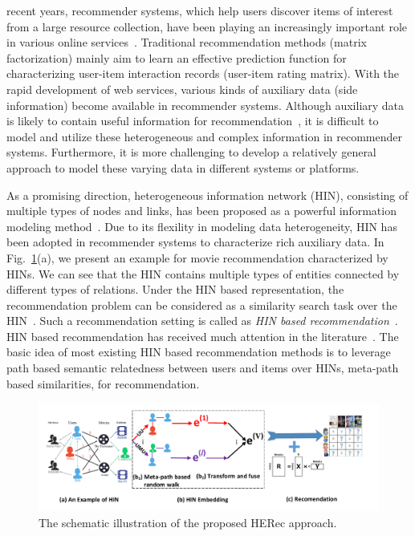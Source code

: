 
 recent years, recommender systems, which help users discover items of interest from a large resource collection, have been playing an increasingly important role in various online services~\cite{dias2008value,koren2015advances}.
Traditional recommendation methods (\eg matrix factorization) mainly aim to learn an effective prediction function for characterizing user-item interaction records (\eg user-item rating matrix). With the rapid development of web services, various kinds of auxiliary data (\aka side information) become available in recommender systems. Although auxiliary data is likely to contain useful information for recommendation~\cite{schafer2007collaborative},
it is difficult to model and utilize these heterogeneous and complex information in recommender systems.
Furthermore, it is more challenging to develop a relatively general approach to model these varying data in different systems or platforms.

As a promising direction, heterogeneous information network (HIN), consisting of multiple types of nodes and links, has been proposed as a powerful information modeling method~\cite{sun2011pathsim,shi2017survey,shi2017heterogeneous}.
 Due to its flexility in modeling data heterogeneity,
 HIN has been adopted in recommender systems to characterize rich auxiliary data.
In Fig.~\ref{fig_framework}(a), we present an example for movie recommendation characterized by HINs.
We can see that the HIN contains multiple types of entities connected by different types of relations.
Under the HIN based representation, the recommendation problem can be considered as a similarity search task over the HIN~\cite{sun2011pathsim}.
Such a recommendation setting is called as \emph{HIN based recommendation}~\cite{yu2013collaborative}.
HIN based recommendation has received much attention in the literature~\cite{feng2012incorporating,yu2013collaborative,yu2014personalized,shi2015semantic,shi2016integrating,zheng2017recommendation}.
 The basic idea of most existing HIN based recommendation methods is to leverage path based semantic relatedness between users and items over HINs, \eg meta-path based similarities,
 for recommendation.

\begin{figure}[t]
\centering
\includegraphics[width=15cm]{image/framework.pdf}
\caption{\label{fig_framework}The schematic illustration of the proposed HERec approach.}
\end{figure}

